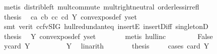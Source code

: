 \begin{isabellebody}
\ {\isacharparenleft}{\kern0pt}metis\ distrib{\isacharunderscore}{\kern0pt}left\ mult{\isachardot}{\kern0pt}commute\ mult{\isachardot}{\kern0pt}right{\isacharunderscore}{\kern0pt}neutral\ order{\isacharunderscore}{\kern0pt}less{\isacharunderscore}{\kern0pt}irrefl{\isacharparenright}{\kern0pt}\isanewline
\ \ \ \ \ \ \isamarkupfalse%
\isanewline
\isanewline
\ \ \ \ \ \ \isamarkupfalse%
\ {\isacharquery}{\kern0pt}thesis\ \isamarkupfalse%
\ ca\ cb\ cc\ cd\ Y{\isacharparenleft}{\kern0pt}{}{\isacharparenright}{\kern0pt}\ convex{\isacharunderscore}{\kern0pt}pos{\isacharunderscore}{\kern0pt}def\ y{\isacharunderscore}{\kern0pt}set\isanewline
\ \ \ \ \ \ \ \ \isamarkupfalse%
\ {\isacharparenleft}{\kern0pt}smt\ {\isacharparenleft}{\kern0pt}verit{\isacharcomma}{\kern0pt}\ ccfv{\isacharunderscore}{\kern0pt}SIG{\isacharparenright}{\kern0pt}\ hull{\isacharunderscore}{\kern0pt}redundant{\isacharunderscore}{\kern0pt}eq\ insertE\ insert{\isacharunderscore}{\kern0pt}Diff\ singletonD{\isacharparenright}{\kern0pt}\isanewline
\ \ \ \ \isamarkupfalse%
\isanewline
\ \ \ \ \isamarkupfalse%
\ \isamarkupfalse%
\ {\isacharquery}{\kern0pt}thesis\ \isamarkupfalse%
\ Y{\isacharparenleft}{\kern0pt}{}{\isacharparenright}{\kern0pt}\ convex{\isacharunderscore}{\kern0pt}pos{\isacharunderscore}{\kern0pt}def\ y{\isacharunderscore}{\kern0pt}set\isanewline
\ \ \ \ \ \ \isamarkupfalse%
\ {\isacharparenleft}{\kern0pt}metis\ hull{\isacharunderscore}{\kern0pt}inc{\isacharparenright}{\kern0pt}\isanewline
\ \ \isamarkupfalse%
\isanewline
\ \ \ \ \isamarkupfalse%
\ False\isanewline
\ \ \ \ \isamarkupfalse%
\ y{\isacharunderscore}{\kern0pt}{}{\isacharcolon}{\kern0pt}{\isachardoublequoteopen}card\ Y\ {\isasymle}\ {}{\isachardoublequoteclose}\isanewline
\ \ \ \ \ \ \isamarkupfalse%
\ Y{\isacharparenleft}{\kern0pt}{}{\isacharparenright}{\kern0pt}\ \isamarkupfalse%
\ linarith\isanewline
\ \ \ \ \isamarkupfalse%
\ \isamarkupfalse%
\ {\isacharquery}{\kern0pt}thesis\isanewline
\ \ \ \ \isamarkupfalse%
{\isacharparenleft}{\kern0pt}cases\ {\isachardoublequoteopen}card\ Y\ {\isacharequal}{\kern0pt}\ {}{\isachardoublequoteclose}{\isacharparenright}{\kern0pt}\isanewline
\ \ \ \ \ \ \isamarkupfalse%

\end{isabellebody}
